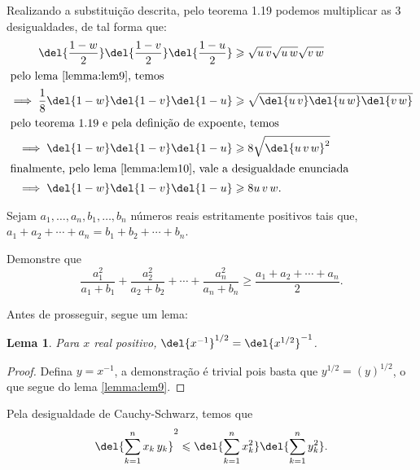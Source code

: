 \documentclass{IMTexam}
\newtheorem{lemma}[theorem]{Lema}
\begin{document}
\begin{questions}
\begin{solution}
			Realizando a substituição descrita, pelo teorema 1.19 podemos multiplicar as 3 desigualdades, de tal forma que:
			\begin{align*}
				\del{\dfrac{1-w}{2}}\del{\dfrac{1-v}{2}}\del{\dfrac{1-u}{2}}&\geqslant \sqrt{u\,v}\sqrt{u\,w}\sqrt{v\,w}\\
				\intertext{pelo lema \ref{lemma:lem9}, temos}
				\implies \dfrac{1}{8}\del{1-w}\del{1-v}\del{1-u}&\geqslant \sqrt{\del{u\,v}\del{u\,w}\del{v\,w}}\\
				\intertext{pelo teorema 1.19 e pela definição de expoente, temos}
				\implies \del{1-w}\del{1-v}\del{1-u}&\geqslant 8\sqrt{\del{u\, v\, w}^{2}}\\
				\intertext{finalmente, pelo lema \ref{lemma:lem10}, vale a desigualdade enunciada}
				\implies \del{1-w}\del{1-v}\del{1-u}&\geqslant 8u\, v\, w.
			\end{align*}
			
			\hfill \qedsymbol
		\end{solution}
		
		  Sejam $ a_1, \ldots, a_n, b_1, \ldots, b_n $ números reais estritamente positivos tais que, $ a_1 + a_2 + \cdots + a_n = b_1 + b_2 + \cdots + b_n $.
		
		Demonstre que \[ \dfrac{a_1^{2}}{a_1+b_1}+\dfrac{a_2^{2}}{a_2+b_2}+\cdots+\dfrac{a_n^{2}}{a_n+b_n}\geqslant \dfrac{a_1+a_2+\cdots + a_n}{2}. \]
		
		\begin{solution}
			Antes de prosseguir, segue um lema:
			
			\begin{lemma}\label{lemma:lem11}
				Para $ x $ real positivo, $ \del{x^{-1}}^{1/2}=\del{x^{1/2}}^{-1} $.
			\end{lemma}
			
			\begin{proof}
				Defina $ y=x^{-1} $, a demonstração é trivial pois basta que $ y^{1/2}=(y)^{1/2} $, o que segue do lema \ref{lemma:lem9}.
			\end{proof}
			
			Pela desigualdade de Cauchy-Schwarz, temos que
			\[ \del{\sum_{k=1}^{n}x_k\,y_k}^{2}\leqslant \del{\sum_{k=1}^{n}x_k^{2}}\del{\sum_{k=1}^{n}y_k^{2}}. \]
			

\end{solution}
\end{questions}
\end{document}
